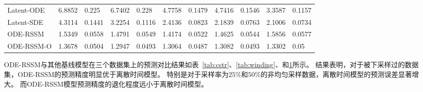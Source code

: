 \begin{table}
{\begin{tabular}{l|ll|ll|ll|ll|ll}
        \hline
        Latent-ODE            & 6.8852 & 0.225   & 6.7402 & 0.228   & 4.7758 & 0.1479  & 4.7416 & 0.1546  & 3.3587 & 0.1157            
             \\
        Latent-SDE       & 4.3114	&   0.1441                   & 3.2254	&   0.1116                 & 2.4136	&   0.0823                    & 2.1839	&   0.0763               & 2.1006	&   0.0734 
             \\    
        \hline
        ODE-RSSM   & 1.5349  & 0.0558                  & 1.4791  & 0.0549                & \cellcolor{Green!30} 1.4174  & \cellcolor{Green!30} 0.0522                  & 1.4625  & 0.0544                & 1.5856  & 0.0577           \\
        ODE-RSSM-O & \cellcolor{Green!60} 1.3678  & \cellcolor{Green!60} 0.0504                  & \cellcolor{Green!30} 1.2947  & \cellcolor{Green!60} 0.0493                & \cellcolor{Green!60} 1.3064  & \cellcolor{Green!60} 0.0487                  & \cellcolor{Green!60} 1.3082  & \cellcolor{Green!30} 0.0493                & \cellcolor{Green!30} 1.3302  & \cellcolor{Green!30} 0.05             \\
        \bottomrule
        \end{tabular}}
\label{tab:thickening}
\end{table}

ODE-RSSM与其他基线模型在三个数据集上的预测对比结果如表~\ref{tab:cstr}、\ref{tab:winding}、和\ref{tab:thickening}所示。
结果表明，对于被下采样过的数据集，ODE-RSSM的预测精度明显优于离散时间模型。
特别是对于采样率为$25\%$和$50\%$的非均匀采样数据，离散时间模型的预测误差显著增大。
而ODE-RSSM模型预测精度的退化程度远小于离散时间模型。


